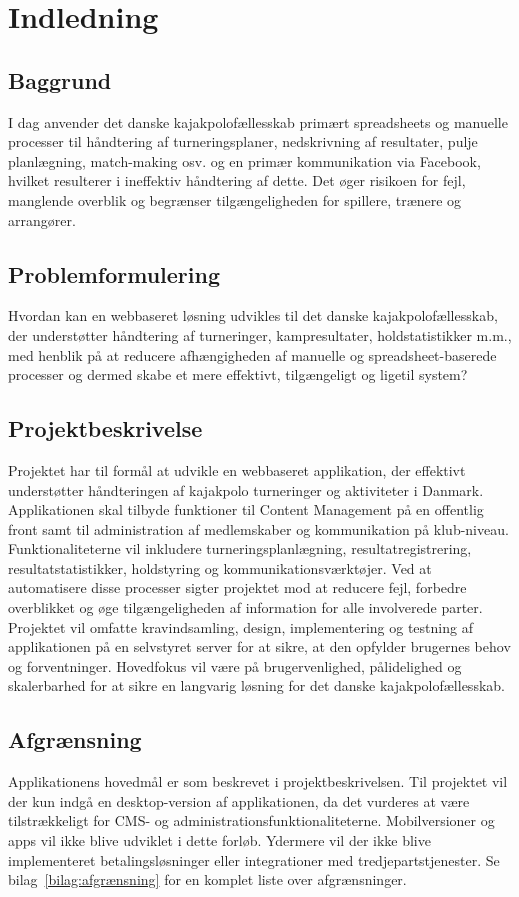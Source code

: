 \section{Indledning}
\subsection{Baggrund}
I dag anvender det danske kajakpolofællesskab primært spreadsheets og manuelle processer til håndtering af
turneringsplaner, nedskrivning af resultater, pulje planlægning, match-making osv. og en primær
kommunikation via Facebook, hvilket resulterer i ineffektiv håndtering af dette. Det øger risikoen
for fejl, manglende overblik og begrænser tilgængeligheden for spillere, trænere og arrangører.

\subsection{Problemformulering}
Hvordan kan en webbaseret løsning udvikles til det danske kajakpolofællesskab, der understøtter
håndtering af turneringer, kampresultater, holdstatistikker m.m., med henblik på at reducere
afhængigheden af manuelle og spreadsheet-baserede processer og dermed skabe et mere effektivt, tilgængeligt
og ligetil system?

\subsection{Projektbeskrivelse}
Projektet har til formål at udvikle en webbaseret applikation, der effektivt understøtter
håndteringen af kajakpolo turneringer og aktiviteter i Danmark. Applikationen skal tilbyde funktioner til
Content Management på en offentlig front samt til administration af medlemskaber og kommunikation på klub-niveau. Funktionaliteterne vil inkludere
turneringsplanlægning, resultatregistrering, resultatstatistikker, holdstyring og kommunikationsværktøjer.
Ved at automatisere disse processer sigter projektet mod at reducere
fejl, forbedre overblikket og øge tilgængeligheden af information for alle involverede parter. Projektet vil
omfatte kravindsamling, design, implementering og testning af applikationen på en selvstyret server for at sikre, at den opfylder
brugernes behov og forventninger. Hovedfokus vil være på brugervenlighed, pålidelighed og skalerbarhed for at sikre en langvarig løsning for det danske kajakpolofællesskab.

\subsection{Afgrænsning}
Applikationens hovedmål er som beskrevet i projektbeskrivelsen. Til projektet vil der kun indgå en desktop-version
af applikationen, da det vurderes at være tilstrækkeligt for CMS- og administrationsfunktionaliteterne. Mobilversioner
og apps vil ikke blive udviklet i dette forløb. Ydermere vil der ikke blive implementeret betalingsløsninger eller integrationer med tredjepartstjenester.
Se bilag~\ref{bilag:afgrænsning} for en komplet liste over afgrænsninger.


